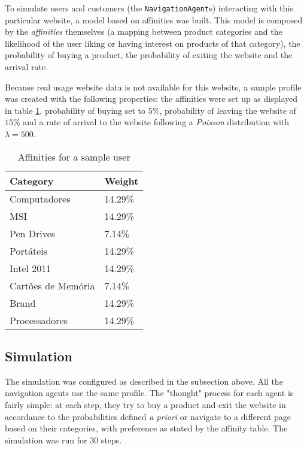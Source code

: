 To simulate users and customers (the \texttt{NavigationAgent}s) interacting 
with this particular website, a model based on affinities was built. This model 
is composed by the \textit{affinities} themselves (a mapping between product 
categories and the likelihood of the user liking or having interest on products 
of that category), the probability of buying a product, the probability of 
exiting the website and the arrival rate.

Because real usage website data is not available for this website, a sample 
profile was created with the following properties: the affinities were set up 
as displayed in table \ref{tab:sample_user}, probability of buying set to 
$5\%$, probability of leaving the website of $15\%$ and a rate of arrival to 
the website following a \textit{Poisson} distribution with $\lambda = 500$.

\begin{table}[h]
    \centering
    \caption{Affinities for a sample user}
    \label{tab:sample_user}
    \begin{tabular}{@{}ll@{}}
        \toprule
        \textbf{Category}  & \textbf{Weight}  \\ \midrule
        Computadores       & 14.29\% \\
        MSI                & 14.29\% \\
        Pen Drives         & 7.14\%  \\
        Portáteis          & 14.29\% \\
        Intel 2011         & 14.29\% \\
        Cartões de Memória & 7.14\%  \\
        Brand              & 14.29\% \\
        Processadores      & 14.29\% \\ \bottomrule
    \end{tabular}
\end{table}

\subsection{Simulation}

The simulation was configured as described in the subsection above. All the 
navigation agents use the same profile. The "thought" process for each agent is 
fairly simple: at each step, they try to buy a product and exit the website in 
accordance to the probabilities defined \textit{a priori} or navigate to a 
different page based on their categories, with preference as stated by the 
affinity table. The simulation was run for 30 steps.

